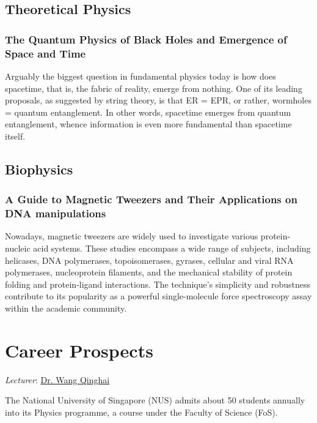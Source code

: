 \documentclass[12pt,a4paper]{article}
\begin{document}
\subsection{Theoretical Physics}
\subsubsection{The Quantum Physics of Black Holes and Emergence of Space and Time}
Arguably the biggest question in fundamental physics today is how does spacetime, that is, the fabric of reality, emerge from nothing. One of its leading proposals, as suggested by string theory, is that ER = EPR, or rather, wormholes = quantum entanglement. In other words, spacetime emerges from quantum entanglement, whence information is even more fundamental than spacetime itself.
\pagebreak

\subsection{Biophysics}
\subsubsection{A Guide to Magnetic Tweezers and Their Applications on DNA manipulations}
Nowadays, magnetic tweezers are widely used to investigate various protein-nucleic acid systems. These studies encompass a wide range of subjects, including helicases, DNA polymerases, topoisomerases, gyrases, cellular and viral RNA polymerases, nucleoprotein filaments, and the mechanical stability of protein folding and protein-ligand interactions. The technique's simplicity and robustness contribute to its popularity as a powerful single-molecule force spectroscopy assay within the academic community.
\pagebreak

\section{Career Prospects}
{\color{red}\textit{Lecturer}}: \href{https://www.physics.nus.edu.sg/faculty/wang-qinghai/}{Dr. Wang Qinghai}

The National University of Singapore (NUS) admits about 50 students annually into its Physics programme, a course under the Faculty of Science (FoS).
\end{document}
